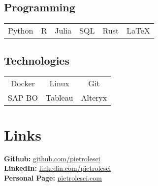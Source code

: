 \documentclass[]{deedy-resume-reversed}
\begin{document}
\begin{minipage}[t]{0.33\textwidth}
\subsection{Programming}
\begin{tabular}{cccccc}
Python & R & Julia & SQL & Rust & \LaTeX
\end{tabular}
\sectionsep

\vspace{-\topsep}
\subsection{Technologies}
\begin{tabular}{ccc}
Docker & Linux & Git\\
SAP BO & Tableau & Alteryx\\
\end{tabular}
\sectionsep



\section{Links}
\textbf{Github:} \href{https://github.com/pietrolesci}{github.com/pietrolesci}\\
\textbf{LinkedIn:} \href{https://www.linkedin.com/in/pietrolesci}{linkedin.com/pietrolesci} \\
\textbf{Personal Page:} \href{https://pietrolesci.com}{pietrolesci.com}
\sectionsep

\end{minipage}
\end{document}
